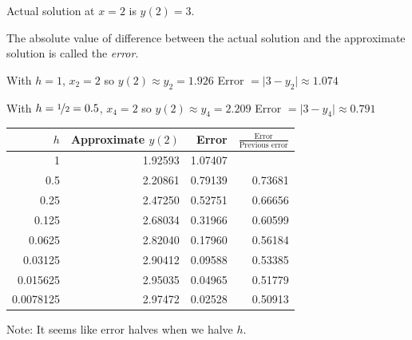 \documentclass[10pt,aspectratio=169]{beamer}
\begin{document}
\begin{frame}
Actual solution at $x=2$ is $y(2) = 3$.

\medskip
\pause

The absolute value of difference between the actual solution and the approximate solution is
called the \emph{error}.

\medskip
\pause

With $h=1$, $x_2=2$ so $y(2) \approx y_2 = 1.926$ 
\qquad
\pause
Error ${}=\lvert 3-y_2 \rvert \approx 1.074$

\medskip
\pause

With $h=\nicefrac{1}{2} = 0.5$, $x_4=2$ so $y(2) \approx y_4 = 2.209$
\qquad
\pause
Error ${}=\lvert 3-y_4 \rvert {}\approx 0.791$

\medskip
\pause

\hspace*{\fill}
\begin{tabular}{@{}rrrr@{}}
\toprule
$h$ & Approximate $y(2)$ & Error & $\frac{\text{Error}}{\text{Previous error}}$ \\
\midrule
1        & 1.92593 & 1.07407 & \\
0.5      & 2.20861 & 0.79139 & 0.73681 \\
0.25     & 2.47250 & 0.52751 & 0.66656 \\
0.125    & 2.68034 & 0.31966 & 0.60599 \\
0.0625   & 2.82040 & 0.17960 & 0.56184 \\
0.03125  & 2.90412 & 0.09588 & 0.53385 \\
0.015625 & 2.95035 & 0.04965 & 0.51779 \\
0.0078125& 2.97472 & 0.02528 & 0.50913 \\
\bottomrule
\end{tabular}
\hspace*{\fill}

\medskip
\pause

Note: It seems like error halves when we halve $h$.

\end{frame}
\end{document}
